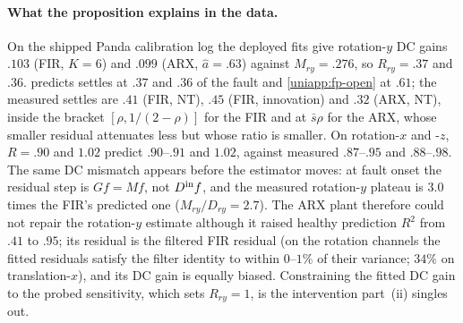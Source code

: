 \paragraph{What the proposition explains in the data.}
On the shipped Panda calibration log the deployed fits give rotation-$y$ DC
gains $.103$ (FIR, $K=6$) and $.099$ (ARX, $\hat a=.63$) against $M_{ry}=.276$,
so $R_{ry}=.37$ and $.36$.  predicts settles at
$.37$ and $.36$ of the fault and \eqref{uniapp:fp-open} at $.61$; the measured
settles are $.41$ (FIR, NT), $.45$ (FIR, innovation) and $.32$ (ARX, NT), inside
the bracket $[\rho,1/(2-\rho)]$ for the FIR and at $\bar s\rho$ for the ARX,
whose smaller residual attenuates less but whose ratio is smaller. On
rotation-$x$ and -$z$, $R=.90$ and $1.02$ predict $.90$--$.91$ and $1.02$,
against measured $.87$--$.95$ and $.88$--$.98$. The same DC mismatch appears
before the estimator moves: at fault onset the residual step is $Gf=Mf$, not
$D^{\rm in}f$, and the measured rotation-$y$ plateau is $3.0$ times the FIR's
predicted one ($M_{ry}/D_{ry}=2.7$). The ARX plant therefore could not repair
the rotation-$y$ estimate although it raised healthy prediction $R^2$ from
$.41$ to $.95$; its residual is the filtered FIR residual (on the rotation
channels the fitted residuals satisfy the filter identity to within $0$--$1\%$
of their variance; $34\%$ on translation-$x$), and its DC gain is equally
biased. Constraining the fitted DC gain to the probed sensitivity, which sets
$R_{ry}=1$, is the intervention part~(ii) singles out.
